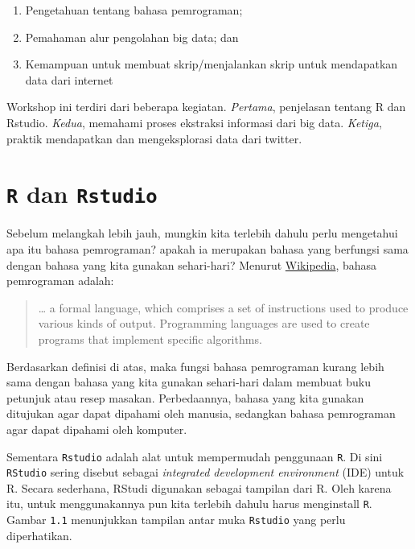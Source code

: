 \documentclass[]{book}
\providecommand{\tightlist}{%
  \setlength{\itemsep}{0pt}\setlength{\parskip}{0pt}}
\theoremstyle{definition}
\theoremstyle{definition}
\theoremstyle{definition}
\theoremstyle{remark}
\begin{document}
\begin{enumerate}
\def\labelenumi{\arabic{enumi}.}
\tightlist
\item
  Pengetahuan tentang bahasa pemrograman;
\item
  Pemahaman alur pengolahan big data; dan
\item
  Kemampuan untuk membuat skrip/menjalankan skrip untuk mendapatkan data
  dari internet
\end{enumerate}

Workshop ini terdiri dari beberapa kegiatan. \emph{Pertama}, penjelasan
tentang R dan Rstudio. \emph{Kedua}, memahami proses ekstraksi informasi
dari big data. \emph{Ketiga}, praktik mendapatkan dan mengeksplorasi
data dari twitter.

\hypertarget{r-dan-rstudio}{%
\chapter{\texorpdfstring{\texttt{R} dan
\texttt{Rstudio}}{R dan Rstudio}}\label{r-dan-rstudio}}

Sebelum melangkah lebih jauh, mungkin kita terlebih dahulu perlu
mengetahui apa itu bahasa pemrograman? apakah ia merupakan bahasa yang
berfungsi sama dengan bahasa yang kita gunakan sehari-hari? Menurut
\href{https://en.wikipedia.org/wiki/Programming_language}{Wikipedia},
bahasa pemrograman adalah:

\begin{quote}
\ldots{} a formal language, which comprises a set of instructions used
to produce various kinds of output. Programming languages are used to
create programs that implement specific algorithms.
\end{quote}

Berdasarkan definisi di atas, maka fungsi bahasa pemrograman kurang
lebih sama dengan bahasa yang kita gunakan sehari-hari dalam membuat
buku petunjuk atau resep masakan. Perbedaannya, bahasa yang kita gunakan
ditujukan agar dapat dipahami oleh manusia, sedangkan bahasa pemrograman
agar dapat dipahami oleh komputer.

Sementara \texttt{Rstudio} adalah alat untuk mempermudah penggunaan
\texttt{R}. Di sini \texttt{RStudio} sering disebut sebagai
\emph{integrated development environment} (IDE) untuk R. Secara
sederhana, RStudi digunakan sebagai tampilan dari R. Oleh karena itu,
untuk menggunakannya pun kita terlebih dahulu harus menginstall
\texttt{R}. Gambar \texttt{1.1} menunjukkan tampilan antar muka
\texttt{Rstudio} yang perlu diperhatikan.
\end{document}
